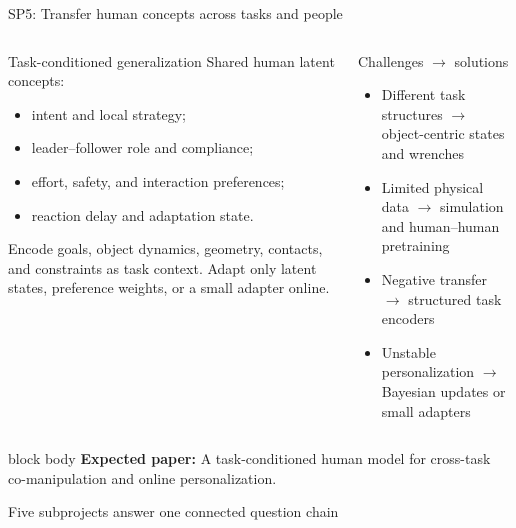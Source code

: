 \documentclass[aspectratio=169,11pt]{beamer}
\newcommand{\paperout}[1]{%
  \begin{beamercolorbox}[rounded=true,sep=0.55em,wd=\linewidth]{block body}
    \footnotesize\textbf{Expected paper:} #1
  \end{beamercolorbox}}
\begin{document}
\begin{frame}[shrink=7]{SP5: Transfer human concepts across tasks and people}
\footnotesize
\begin{columns}[T,onlytextwidth]
\begin{block}{Task-conditioned generalization}
Shared human latent concepts:
\begin{itemize}
  \item intent and local strategy;
  \item leader--follower role and compliance;
  \item effort, safety, and interaction preferences;
  \item reaction delay and adaptation state.
\end{itemize}
Encode goals, object dynamics, geometry, contacts, and constraints as task context. Adapt only latent states, preference weights, or a small adapter online.
\end{block}
\begin{alertblock}{Challenges $\rightarrow$ solutions}
\begin{itemize}
  \item Different task structures $\rightarrow$ object-centric states and wrenches
  \item Limited physical data $\rightarrow$ simulation and human--human pretraining
  \item Negative transfer $\rightarrow$ structured task encoders
  \item Unstable personalization $\rightarrow$ Bayesian updates or small adapters
\end{itemize}
\end{alertblock}
\end{columns}
\vspace{0.15cm}
\paperout{A task-conditioned human model for cross-task co-manipulation and online personalization.}
\end{frame}

\begin{frame}[shrink=5]{Five subprojects answer one connected question chain}
\centering
{}
\end{frame}
\end{document}
